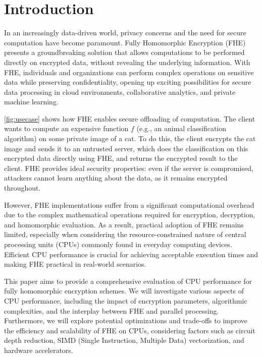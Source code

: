 \section{Introduction}\label{sec:introduction}


In an increasingly data-driven world, privacy concerns and the need for secure
computation have become paramount. Fully Homomorphic Encryption (FHE) presents
a groundbreaking solution that allows computations to be performed directly on
encrypted data, without revealing the underlying information. With FHE,
individuals and organizations can perform complex operations on sensitive data
while preserving confidentiality, opening up exciting possibilities for secure
data processing in cloud environments, collaborative analytics, and private
machine learning.


\autoref{fig:usecase} shows how FHE enables secure offloading of computation.
The client wants to compute an expensive function $f$ (e.g., an animal classification
algorithm) on some private image of a cat. To do this, the client encrypts the cat image and
sends it to an untrusted server, which does the classification on this encrypted data
directly using FHE, and returns the encrypted result to the client.
FHE provides ideal security properties: even if the server is compromised,
attackers cannot learn anything about the data, as it remains encrypted
throughout.

However, FHE implementations suffer from a significant computational overhead
due to the complex mathematical operations required for encryption, decryption,
and homomorphic evaluation. As a result, practical adoption of FHE remains
limited, especially when considering the resource-constrained nature of central
processing units (CPUs) commonly found in everyday computing devices. Efficient
CPU performance is crucial for achieving acceptable execution times and making
FHE practical in real-world scenarios.

\figUsecase

This paper aims to provide a comprehensive evaluation of CPU performance for
fully homomorphic encryption schemes. We will investigate various aspects of
CPU performance, including the impact of encryption parameters, algorithmic
complexities, and the interplay between FHE and parallel processing.
Furthermore, we will explore potential optimizations and trade-offs to improve
the efficiency and scalability of FHE on CPUs, considering factors such as
circuit depth reduction, SIMD (Single Instruction, Multiple Data)
vectorization, and hardware accelerators.

